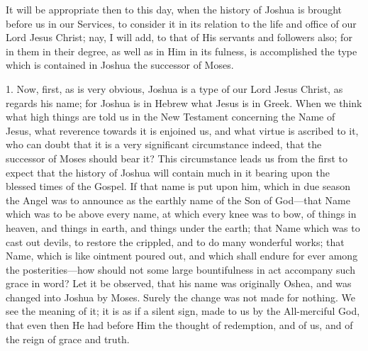 It will be appropriate then to this day, when the history of Joshua
is brought before us in our Services, to consider it in its relation
to the life and office of our Lord Jesus Christ; nay, I will add, to
that of His servants and followers also; for in them in their degree,
as well as in Him in its fulness, is accomplished the type which is
contained in Joshua the successor of Moses.

1. Now, first, as is very obvious, Joshua is a type of our Lord
Jesus Christ, as regards his name; for Joshua is in Hebrew what Jesus
is in Greek. When we think what high things are told us in the New
Testament concerning the Name of Jesus, what reverence towards it is
enjoined us, and what virtue is ascribed to it, who can doubt that it
is a very significant circumstance indeed, that the successor of Moses
should bear it? This circumstance leads us from the first to expect
that the history of Joshua will contain much in it bearing upon the
blessed times of the Gospel. If that name is put upon him, which in
due season the Angel was to announce as the earthly name of the Son of
God—that Name which was to be above every name, at which every knee
was to bow, of things in heaven, and things in earth, and things under
the earth; that Name which was to cast out devils, to restore the
crippled, and to do many wonderful works; that Name, which is like
ointment poured out, and which shall endure for ever among the
posterities—how should not some large bountifulness in act accompany
such grace in word? Let it be observed, that his name was originally
Oshea, and was changed into Joshua by Moses. Surely the change was not
made for nothing. We see the meaning of it; it is as if a silent sign,
made to us by the All-merciful God, that even then He had before Him
the thought of redemption, and of us, and of the reign of grace and
truth.

